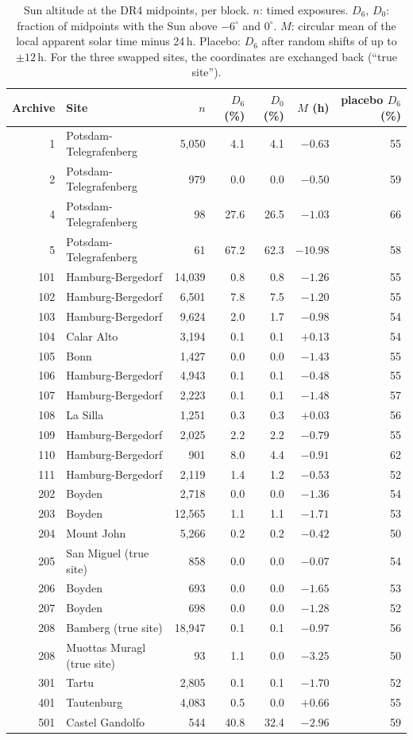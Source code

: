 \documentclass[11pt]{article}
\begin{document}
\begin{table}[t]
\centering\small
\begin{tabular}{rlrrrrr}\toprule
Archive & Site & $n$ & $D_6$ (\%) & $D_0$ (\%) & $M$ (h) & placebo $D_6$ (\%)\\\midrule
1 & Potsdam-Telegrafenberg & 5{,}050 & 4.1 & 4.1 & $-0.63$ & 55\\
2 & Potsdam-Telegrafenberg & 979 & 0.0 & 0.0 & $-0.50$ & 59\\
4 & Potsdam-Telegrafenberg & 98 & 27.6 & 26.5 & $-1.03$ & 66\\
5 & Potsdam-Telegrafenberg & 61 & 67.2 & 62.3 & $-10.98$ & 58\\
101 & Hamburg-Bergedorf & 14{,}039 & 0.8 & 0.8 & $-1.26$ & 55\\
102 & Hamburg-Bergedorf & 6{,}501 & 7.8 & 7.5 & $-1.20$ & 55\\
103 & Hamburg-Bergedorf & 9{,}624 & 2.0 & 1.7 & $-0.98$ & 54\\
104 & Calar Alto & 3{,}194 & 0.1 & 0.1 & $+0.13$ & 54\\
105 & Bonn & 1{,}427 & 0.0 & 0.0 & $-1.43$ & 55\\
106 & Hamburg-Bergedorf & 4{,}943 & 0.1 & 0.1 & $-0.48$ & 55\\
107 & Hamburg-Bergedorf & 2{,}223 & 0.1 & 0.1 & $-1.48$ & 57\\
108 & La Silla & 1{,}251 & 0.3 & 0.3 & $+0.03$ & 56\\
109 & Hamburg-Bergedorf & 2{,}025 & 2.2 & 2.2 & $-0.79$ & 55\\
110 & Hamburg-Bergedorf & 901 & 8.0 & 4.4 & $-0.91$ & 62\\
111 & Hamburg-Bergedorf & 2{,}119 & 1.4 & 1.2 & $-0.53$ & 52\\
202 & Boyden & 2{,}718 & 0.0 & 0.0 & $-1.36$ & 54\\
203 & Boyden & 12{,}565 & 1.1 & 1.1 & $-1.71$ & 53\\
204 & Mount John & 5{,}266 & 0.2 & 0.2 & $-0.42$ & 50\\
205 & San Miguel (true site) & 858 & 0.0 & 0.0 & $-0.07$ & 54\\
206 & Boyden & 693 & 0.0 & 0.0 & $-1.65$ & 53\\
207 & Boyden & 698 & 0.0 & 0.0 & $-1.28$ & 52\\
208 & Bamberg (true site) & 18{,}947 & 0.1 & 0.1 & $-0.97$ & 56\\
208 & Muottas Muragl (true site) & 93 & 1.1 & 0.0 & $-3.25$ & 50\\
301 & Tartu & 2{,}805 & 0.1 & 0.1 & $-1.70$ & 52\\
401 & Tautenburg & 4{,}083 & 0.5 & 0.0 & $+0.66$ & 55\\
501 & Castel Gandolfo & 544 & 40.8 & 32.4 & $-2.96$ & 59\\
\bottomrule\end{tabular}
\caption{Sun altitude at the DR4 midpoints, per block. $n$: timed exposures. $D_6$, $D_0$: fraction of midpoints with the Sun above $-6^\circ$ and $0^\circ$. $M$: circular mean of the local apparent solar time minus 24\,h. Placebo: $D_6$ after random shifts of up to $\pm12$\,h. For the three swapped sites, the coordinates are exchanged back (``true site'').}
\label{tab:blocks}
\end{table}
\end{document}
